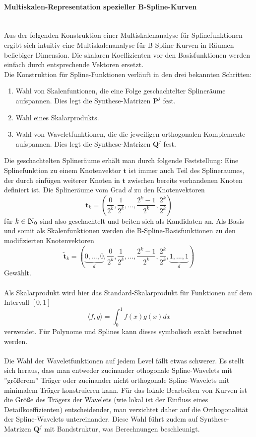\paragraph{Multiskalen-Representation spezieller B-Spline-Kurven}~\\
Aus der folgenden Konstruktion einer Multiskalenanalyse für Splinefunktionen ergibt sich intuitiv eine Multiskalenanalyse für B-Spline-Kurven in Räumen beliebiger Dimension. Die skalaren Koeffizienten vor den  Basisfunktionen werden einfach durch entsprechende Vektoren ersetzt. \\
Die Konstruktion für Spline-Funktionen verläuft in den drei bekannten Schritten: 
\begin{enumerate}
\item Wahl von Skalenfuntionen, die eine Folge geschachtelter Splineräume aufspannen. Dies legt die Synthese-Matrizen $\mathbf{P}^j$ fest. 
\item Wahl eines Skalarprodukts. 
\item Wahl von Waveletfunktionen, die die jeweiligen orthogonalen Komplemente aufspannen. Dies legt die Synthese-Matrizen $\mathbf{Q}^j$ fest.
\end{enumerate}
Die geschachtelten Splineräume erhält man durch folgende Feststellung: Eine Splinefunktion zu einem Knotenvektor $\mathbf{t}$ ist immer auch Teil des Splineraumes, der durch einfügen weiterer Knoten in $\mathbf{t}$ zwischen bereits vorhandenen Knoten definiert ist.
Die Splineräume vom Grad $d$ zu den Knotenvektoren
\[
\mathbf{t}_k=(\frac{0}{2^k},\frac{1}{2^k},...,\frac{2^k-1}{2^k},\frac{2^k}{2^k})
\]
für $k\in{\rm I\!N}_0$ sind also geschachtelt und beiten sich als Kandidaten an. Als Basis und somit als Skalenfunktionen werden die B-Spline-Basisfunktionen zu den modifizierten Knotenvektoren
\[
\mathbf{\tilde{t}}_k=(\underbrace{0,...,0}_{d},\frac{0}{2^k},\frac{1}{2^k},...,\frac{2^k-1}{2^k},\frac{2^k}{2^k},\underbrace{1,...,1}_{d})
\]
Gewählt.\\
\\
Als Skalarprodukt wird hier das Standard-Skalarprodukt für Funktionen auf dem Intervall $[0,1]$
\[
\langle f,g\rangle =\int_0^1f(x)g(x)dx
\]
verwendet. Für Polynome und Splines kann dieses symbolisch exakt berechnet werden.\\
\\
Die Wahl der Waveletfunktionen auf jedem Level fällt etwas schwerer. Es stellt sich heraus, dass man entweder zueinander othogonale Spline-Wavelets mit ''größerem'' Träger oder zueinander nicht orthogonale Spline-Wavelets mit minimalem Träger konstruieren kann. Für das lokale Bearbeiten von Kurven ist die Größe des Trägers der Wavelets (wie lokal ist der Einfluss eines Detailkoeffizienten) entscheidender, man verzichtet daher auf die Orthogonalität der Spline-Wavelets untereinander. Diese Wahl führt zudem auf Synthese-Matrizen $\mathbf{Q}^j$ mit Bandstruktur, was Berechnungen beschleunigt.
